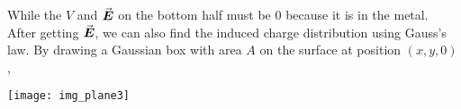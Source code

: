 \documentclass[class=article, crop=false, 12pt]{standalone}
\begin{document}
\begin{example}
    While the $V$ and $\va*{E}$ on the bottom half must be $0$ because it is in the metal.\\

    After getting $\va*{E}$, 
    we can also find the induced charge distribution using Gauss's law.
    By drawing a Gaussian box with area $A$ on the surface at position $(x,y,0)$,
    \begin{center}
        \begin{minipage}{0.4\linewidth}
        \end{minipage}
        \hspace{0.05\textwidth}
        \begin{minipage}{0.4\linewidth}
            \centering
            \texttt{[image: img\_plane3]}
        \end{minipage}
    \end{center}

\end{example}
\end{document}
